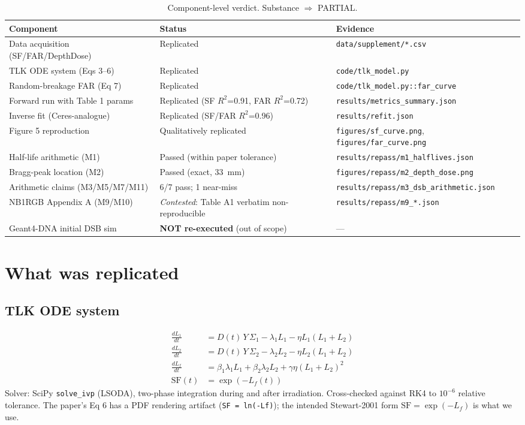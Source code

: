\documentclass[11pt]{article}
\begin{document}
\begin{table}[h!]
\centering
\small
\begin{tabular}{lll}
\toprule
Component & Status & Evidence \\
\midrule
Data acquisition (SF/FAR/DepthDose) & Replicated & \texttt{data/supplement/*.csv} \\
TLK ODE system (Eqs 3--6) & Replicated & \texttt{code/tlk\_model.py} \\
Random-breakage FAR (Eq 7) & Replicated & \texttt{code/tlk\_model.py::far\_curve} \\
Forward run with Table 1 params & Replicated (SF $R^2$=0.91, FAR $R^2$=0.72) & \texttt{results/metrics\_summary.json} \\
Inverse fit (Ceres-analogue) & Replicated (SF/FAR $R^2$=0.96) & \texttt{results/refit.json} \\
Figure 5 reproduction & Qualitatively replicated & \texttt{figures/sf\_curve.png}, \texttt{figures/far\_curve.png} \\
Half-life arithmetic (M1) & Passed (within paper tolerance) & \texttt{results/repass/m1\_halflives.json} \\
Bragg-peak location (M2) & Passed (exact, 33~mm) & \texttt{figures/repass/m2\_depth\_dose.png} \\
Arithmetic claims (M3/M5/M7/M11) & 6/7 pass; 1 near-miss & \texttt{results/repass/m3\_dsb\_arithmetic.json} \\
NB1RGB Appendix A (M9/M10) & \emph{Contested}: Table A1 verbatim non-reproducible & \texttt{results/repass/m9\_*.json} \\
Geant4-DNA initial DSB sim & \textbf{NOT re-executed} (out of scope) & --- \\
\bottomrule
\end{tabular}
\caption{Component-level verdict. Substance $\Rightarrow$ PARTIAL.}
\end{table}

\section{What was replicated}
\subsection{TLK ODE system}
\begin{align}
\frac{dL_1}{dt} &= D(t)\,Y\,\Sigma_1 - \lambda_1 L_1 - \eta L_1 (L_1+L_2) \\
\frac{dL_2}{dt} &= D(t)\,Y\,\Sigma_2 - \lambda_2 L_2 - \eta L_2 (L_1+L_2) \\
\frac{dL_f}{dt} &= \beta_1 \lambda_1 L_1 + \beta_2 \lambda_2 L_2 + \gamma \eta (L_1+L_2)^2 \\
\mathrm{SF}(t) &= \exp(-L_f(t))
\end{align}
Solver: SciPy \texttt{solve\_ivp} (LSODA), two-phase integration during and after
irradiation. Cross-checked against RK4 to $10^{-6}$ relative tolerance.
The paper's Eq 6 has a PDF rendering artifact (\texttt{SF = ln(-Lf)}); the intended
Stewart-2001 form $\mathrm{SF}=\exp(-L_f)$ is what we use.
\end{document}
